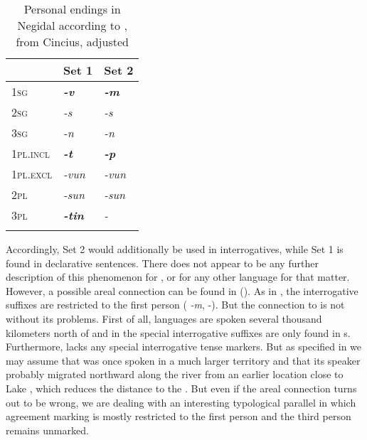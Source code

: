 \begin{table}
\caption{Personal endings in Negidal according to \cite[88f.]{Ikegami1985}, from Cincius, adjusted}
\label{tab:tungu:1}

\begin{tabularx}{\textwidth}{XXl}
\lsptoprule
& \textbf{Set 1} & \textbf{Set 2}\\
\midrule
1\textsc{sg} & \textbf{\textit{-v}} & \textbf{\textit{-m}}\\
2\textsc{sg} & \textit{-s} & \textit{-s}\\
3\textsc{sg} & \textit{-n} & \textit{-n}\\
1\textsc{pl.incl} & \textbf{\textit{-t}} & \textbf{\textit{-p}}\\
1\textsc{pl.excl} & \textit{-vun} & \textit{-vun}\\
2\textsc{pl} & \textit{-sun} & \textit{-sun}\\
3\textsc{pl} & \textbf{\textit{-tin}} & \textit{-}\\
\lspbottomrule
\end{tabularx}
\end{table}

Accordingly, Set 2 would additionally be used in interrogatives, while Set 1 is found in declarative sentences. There does not appear to be any further description of this phenomenon for , or for any other  language for that matter. However, a possible areal connection can be found in  (). As in , the  interrogative suffixes are restricted to the first person ( \textit{-m},  -). But the connection to  is not without its problems. First of all,  languages are spoken several thousand kilometers north of  and in  the special interrogative suffixes are only found in s. Furthermore,  lacks any special interrogative tense markers. But as specified in  we may assume that  was once spoken in a much larger territory and that its speaker probably migrated northward along the  river from an earlier location close to Lake , which reduces the distance to the . But even if the areal connection turns out to be wrong, we are dealing with an interesting typological parallel in which  agreement marking is mostly restricted to the first person and the third person  remains unmarked.

